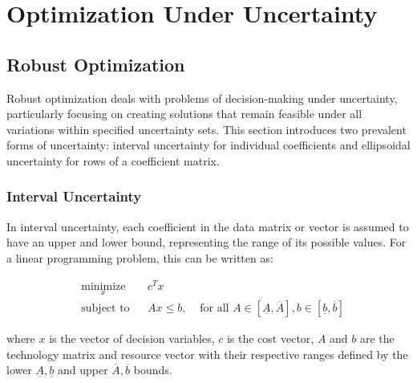 \chapter{Optimization Under Uncertainty}

\section{Robust Optimization}
Robust optimization deals with problems of decision-making under uncertainty, particularly focusing on creating solutions that remain feasible under all variations within specified uncertainty sets. This section introduces two prevalent forms of uncertainty: interval uncertainty for individual coefficients and ellipsoidal uncertainty for rows of a coefficient matrix.

\subsection{Interval Uncertainty}
In interval uncertainty, each coefficient in the data matrix or vector is assumed to have an upper and lower bound, representing the range of its possible values. For a linear programming problem, this can be written as:

\begin{equation}
\begin{aligned}
& \underset{x}{\text{minimize}}
& & c^T x \\
& \text{subject to}
& & A x \leq b, & \text{ for all } A \in [\underline{A}, \overline{A}], b \in [\underline{b}, \overline{b}]
\end{aligned}
\end{equation}

where \(x\) is the vector of decision variables, \(c\) is the cost vector, \(A\) and \(b\) are the technology matrix and resource vector with their respective ranges defined by the lower \(\underline{A}, \underline{b}\) and upper \(\overline{A}, \overline{b}\) bounds. 
\begin{center}
\end{center}

